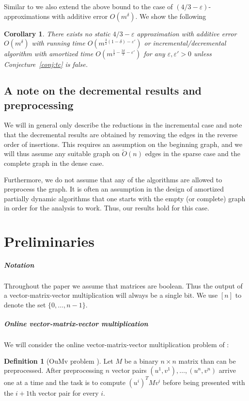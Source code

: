 \documentclass[a4paper,11pt]{article}
\newcommand{\eps}{\varepsilon}
\newcommand{\Ot}{\tilde{O}}
\newtheorem{corollary}{Corollary}
\theoremstyle{definition}
\newtheorem{definition}{Definition}
\begin{document}
Similar to \cite{ChechikLRSTW14,CairoGR16} we also extend the above bound to
the case of $(4/3-\eps)$-approximations with additive error $O(m^\delta)$. We
show the following
\begin{corollary}\label{cor:diam_add}
    There exists no static $4/3-\eps$ approximation with additive error
    $O(m^\delta)$ with running time $O(m^{\frac{3}{2}(1-\delta) - \eps'})$ or
    incremental/decremental algorithm with amortized time $O(m^{\frac{1}{2} -
    \frac{3\delta}{2} - \eps'})$ for any $\eps,\eps' > 0$ unless
    Conjecture~\ref{conj:tc} is false.
\end{corollary}

\subsection{A note on the decremental results and preprocessing}
We will in general only describe the reductions in the incremental case and
note that the decremental results are obtained by removing the edges in the
reverse order of insertions. This requires an assumption on the beginning
graph, and we will thus assume any suitable graph on $\Ot(n)$ edges in the
sparse case and the complete graph in the dense case.

Furthermore, we do not assume that any of the algorithms are allowed to
preprocess the graph. It is often an assumption in the design of amortized
partially dynamic algorithms that one starts with the empty (or complete) graph
in order for the analysis to work. Thus, our results hold for this case.


\section{Preliminaries}

\subparagraph*{Notation}
Throughout the paper we assume that matrices are boolean. Thus the output
of a vector-matrix-vector multiplication will always be a single bit. We
use $[n]$ to denote the set $\{0,\ldots,n-1\}$.

\subparagraph*{Online vector-matrix-vector multiplication}

We will consider the online vector-matrix-vector multiplication problem of
\cite{HenzingerKNS15}:

\begin{definition}[OuMv problem \cite{HenzingerKNS15}]\label{defn:oumv}
    Let $M$ be a binary $n\times n$ matrix than can be preprocessed. After
    preprocessing $n$ vector pairs $(u^1,v^1), \ldots, (u^n,v^n)$ arrive one at
    a time and the task is to compute $(u^i)^T M v^i$ before being presented with
    the $i+1$th vector pair for every $i$.
\end{definition}
\end{document}

